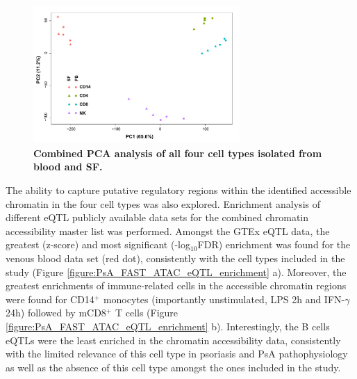 \begin{figure}[H]
\centering
\includegraphics[width=0.7\textwidth]{./Results3/pdfs/ATAC_PSA_all_DESEq2_PCA}
\caption[Combined PCA analysis of all four cell types isolated from blood and SF.]{\textbf{Combined PCA analysis of all four cell types isolated from blood and SF.}}
\label{figure:PsA_FAST_ATAC_PCA}
\end{figure}

The ability to capture putative regulatory regions within the identified accessible chromatin in the four cell types was also explored. Enrichment analysis of different eQTL publicly available data sets for the combined chromatin accessibility master list was performed. Amongst the GTEx eQTL data, the greatest (z-score) and most significant (-log$_10$FDR) enrichment was found for the venous blood data set (red dot), consistently with the cell types included in the study (Figure \ref{figure:PsA_FAST_ATAC_eQTL_enrichment} a). Moreover, the greatest enrichments of immune-related cells in the accessible chromatin regions were found for CD14$^+$ monocytes (importantly unstimulated, LPS 2h and IFN-$\gamma$ 24h) followed by mCD8$^+$ T cells (Figure \ref{figure:PsA_FAST_ATAC_eQTL_enrichment} b). Interestingly, the B cells eQTLs were the least enriched in the chromatin accessibility data, consistently with the limited relevance of this cell type in psoriasis and PsA pathophysiology as well as the absence of this cell type amongst the ones included in the study.       

